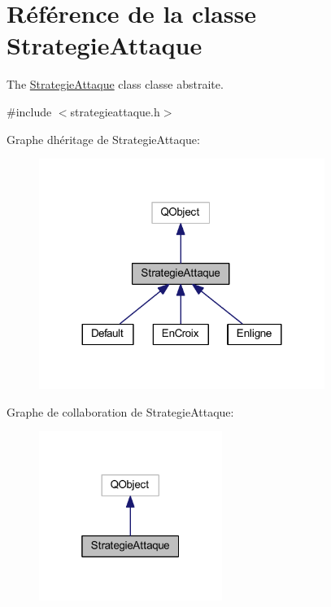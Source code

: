 \hypertarget{class_strategie_attaque}{}\section{Référence de la classe Strategie\+Attaque}
\label{class_strategie_attaque}


The \hyperlink{class_strategie_attaque}{Strategie\+Attaque} class classe abstraite.  




{\ttfamily \#include $<$strategieattaque.\+h$>$}



Graphe d\textquotesingle{}héritage de Strategie\+Attaque\+:
\nopagebreak
\begin{figure}[H]
\begin{center}
\leavevmode
\includegraphics[width=263pt]{class_strategie_attaque__inherit__graph}
\end{center}
\end{figure}


Graphe de collaboration de Strategie\+Attaque\+:
\nopagebreak
\begin{figure}[H]
\begin{center}
\leavevmode
\includegraphics[width=169pt]{class_strategie_attaque__coll__graph}
\end{center}
\end{figure}
